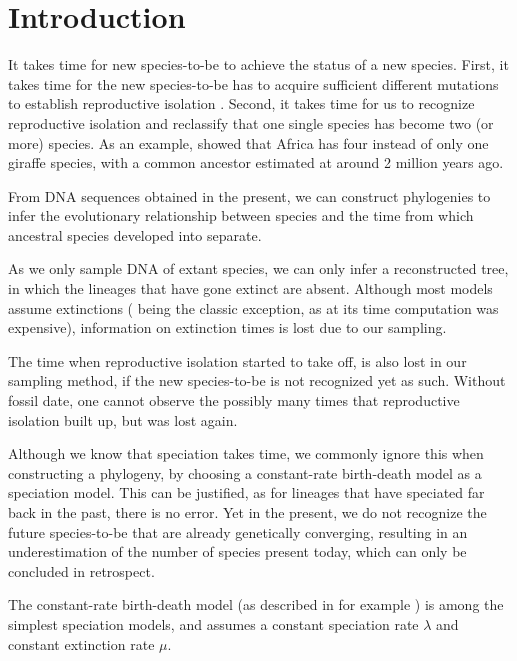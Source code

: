 \section{Introduction}


It takes time for new species-to-be to achieve the status of a new species.
First, it takes time for the new species-to-be has to acquire sufficient different mutations to 
establish reproductive isolation \cite{schluter2001ecology}. Second, 
it takes time for us to recognize reproductive isolation
and reclassify that one single species has become two (or more) species. As an
example, \cite{fennessy2016multi} showed that Africa has four instead of only one
giraffe species, with a common ancestor estimated at around 2 million years ago.


From DNA sequences obtained in the present, we can construct phylogenies
to infer the evolutionary relationship between species and the time 
from which ancestral species developed into separate.
  
As we only sample DNA of extant species, 
we can only infer a reconstructed tree, in which
the lineages that have gone extinct are absent.
Although most models assume extinctions (\cite{yule1925mathematical} being the
classic exception, as at its time computation was expensive), 
information on extinction times is lost due to our sampling.


The time when reproductive isolation started to take off, is
also lost in our sampling method, if the new species-to-be is not 
recognized yet as such. Without fossil date, one cannot observe the
possibly many times that reproductive isolation built up, but was lost again.


Although we know that speciation takes time, we commonly ignore this when
constructing a phylogeny, by choosing a constant-rate birth-death model
as a speciation model. This can be justified, as for lineages 
that have speciated far back in the past, there is no error. 
Yet in the present, we do not recognize the future species-to-be
that are already genetically converging, resulting in an underestimation
of the number of species present today, which can only be 
concluded in retrospect.

The constant-rate birth-death model (as described in for example \cite{nee1994reconstructed}) 
is among the simplest speciation models, and assumes a constant speciation
 rate $\lambda$ and constant extinction rate $\mu$.

